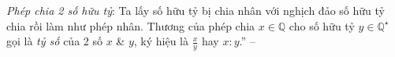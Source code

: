 \documentclass{article}
\numberwithin{equation}{section}
\begin{document}
\noindent\textit{Phép chia 2 số hữu tỷ}: Ta lấy số hữu tỷ bị chia nhân với nghịch đảo số hữu tỷ chia rồi làm như phép nhân. Thương của phép chia $x\in\mathbb{Q}$ cho số hữu tỷ $y\in\mathbb{Q}^\star$ gọi là \textit{tỷ số} của 2 số $x$ \& $y$, ký hiệu là $\frac{x}{y}$ hay $x:y$.'' -- \cite[\S3, p. 10]{Trong_Toan_7_2022}


\printbibliography[heading=bibintoc]
	
\end{document}
